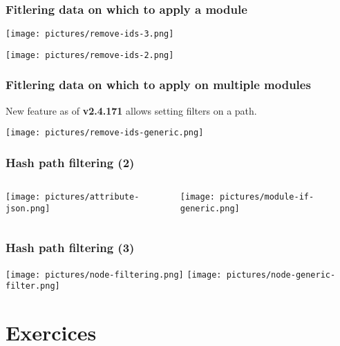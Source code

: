 \begin{frame}
    \frametitle{Fitlering data on which to apply a module}
    \begin{center}
        \texttt{[image: pictures/remove-ids-3.png]}
    \end{center}
    \begin{center}
        \texttt{[image: pictures/remove-ids-2.png]}
    \end{center}
\end{frame}

\begin{frame}
    \frametitle{Fitlering data on which to apply on multiple modules}
    New feature as of \textbf{v2.4.171} allows setting filters on a path.
    \begin{center}
        \texttt{[image: pictures/remove-ids-generic.png]}
    \end{center}
\end{frame}

\begin{frame}[fragile]
    \frametitle{Hash path filtering (2)}
    \begin{columns}
        \begin{column}{0.5\textwidth}
            \begin{center}
                \texttt{[image: pictures/attribute-json.png]}
            \end{center}
        \end{column}
        \begin{column}{0.5\textwidth}
            \texttt{[image: pictures/module-if-generic.png]}
        \end{column}
    \end{columns}
\end{frame}

\begin{frame}[fragile]
    \frametitle{Hash path filtering (3)}
    \begin{center}
        \texttt{[image: pictures/node-filtering.png]}
        \texttt{[image: pictures/node-generic-filter.png]}
    \end{center}
\end{frame}

\section{Exercices}
